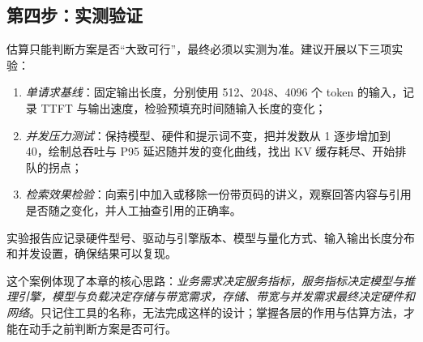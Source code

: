 \subsection{第四步：实测验证}

估算只能判断方案是否“大致可行”，最终必须以实测为准。建议开展以下三项实验：
\begin{enumerate}
  \item \emph{单请求基线}：固定输出长度，分别使用 512、2048、4096 个 token 的输入，记录 TTFT 与输出速度，检验预填充时间随输入长度的变化；
  \item \emph{并发压力测试}：保持模型、硬件和提示词不变，把并发数从 1 逐步增加到 40，绘制总吞吐与 P95 延迟随并发的变化曲线，找出 KV 缓存耗尽、开始排队的拐点；
  \item \emph{检索效果检验}：向索引中加入或移除一份带页码的讲义，观察回答内容与引用是否随之变化，并人工抽查引用的正确率。
\end{enumerate}
实验报告应记录硬件型号、驱动与引擎版本、模型与量化方式、输入输出长度分布和并发设置，确保结果可以复现。

\begin{keypoints}
这个案例体现了本章的核心思路：\emph{业务需求决定服务指标，服务指标决定模型与推理引擎，模型与负载决定存储与带宽需求，存储、带宽与并发需求最终决定硬件和网络}。只记住工具的名称，无法完成这样的设计；掌握各层的作用与估算方法，才能在动手之前判断方案是否可行。
\end{keypoints}
